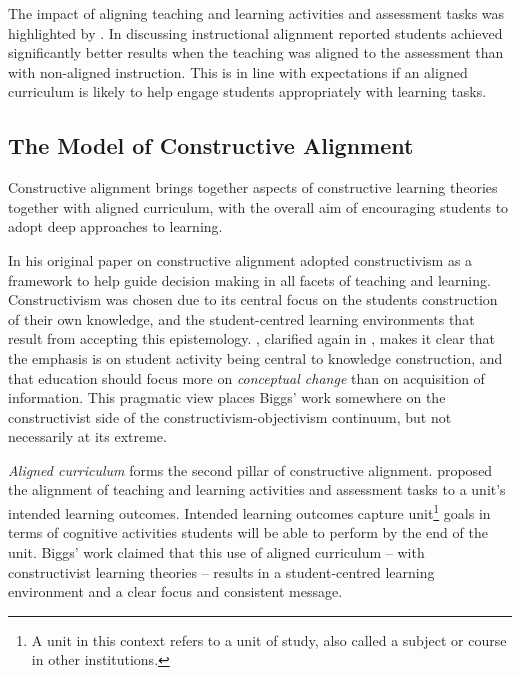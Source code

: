The impact of aligning teaching and learning activities and assessment tasks was highlighted by \citet{Cohen:1987}. In discussing instructional alignment \citet{Cohen:1987} reported students achieved significantly better results when the teaching was aligned to the assessment than with non-aligned instruction. This is in line with expectations if an aligned curriculum is likely to help engage students appropriately with learning tasks.


\subsection{The Model of Constructive Alignment} %
\label{sub:the_model_of_constructive_alignment}

Constructive alignment brings together aspects of constructive learning theories together with aligned curriculum, with the overall aim of encouraging students to adopt deep approaches to learning.

In his original paper on constructive alignment \citet{Biggs:1996c} adopted constructivism as a framework to help guide decision making in all facets of teaching and learning. Constructivism was chosen due to its central focus on the students construction of their own knowledge, and the student-centred learning environments that result from accepting this epistemology. \citet{Biggs:1996c}, clarified again in \citet{Biggs:2007}, makes it clear that the emphasis is on student activity being central to knowledge construction, and that education should focus more on \emph{conceptual change} than on acquisition of information. This pragmatic view places Biggs' work somewhere on the constructivist side of the constructivism-objectivism continuum, but not necessarily at its extreme. 

\emph{Aligned curriculum} forms the second pillar of constructive alignment. \citet{Biggs:1996c} proposed the alignment of teaching and learning activities and assessment tasks to a unit's intended learning outcomes. Intended learning outcomes capture unit\footnote{A unit in this context refers to a unit of study, also called a subject or course in other institutions.} goals in terms of cognitive activities students will be able to perform by the end of the unit. Biggs' work claimed that this use of aligned curriculum -- with constructivist learning theories -- results in a student-centred learning environment and a clear focus and consistent message.

